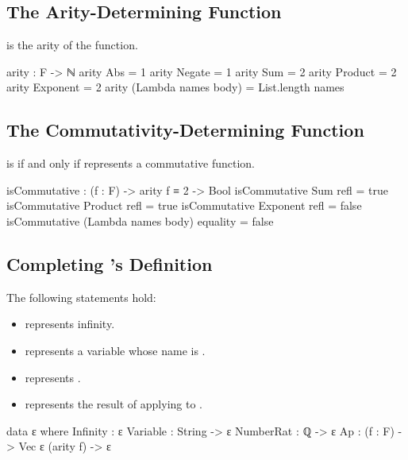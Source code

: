 \documentclass{report}
\begin{document}
\subsection{The Arity-Determining Function}
  is the arity of the  function.

\begin{code}
arity : F -> ℕ
arity Abs = 1
arity Negate = 1
arity Sum = 2
arity Product = 2
arity Exponent = 2
arity (Lambda names body) = List.length names
\end{code}

\subsection{The Commutativity-Determining Function}
   is  if and only if  represents a commutative function.

\begin{code}
isCommutative : (f : F) -> arity f ≡ 2 -> Bool
isCommutative Sum refl = true
isCommutative Product refl = true
isCommutative Exponent refl = false
isCommutative (Lambda names body) equality = false
\end{code}

\subsection{Completing 's Definition}
The following statements hold:

\begin{itemize}
  \item {} represents infinity.
  \item {}  represents a variable whose name is .
  \item {}  represents .
  \item {}   represents the result of applying  to .
\end{itemize}

\begin{code}
data ε where
  Infinity : ε
  Variable : String -> ε
  NumberRat : ℚ -> ε
  Ap : (f : F) -> Vec ε (arity f) -> ε
\end{code}
\end{document}
